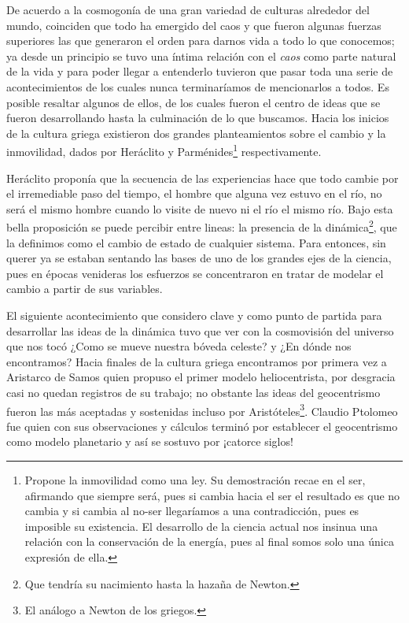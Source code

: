 \documentclass[11pt,a4paper]{article}
\begin{document}
De acuerdo a la cosmogonía de una gran variedad de culturas alrededor del mundo, coinciden que todo ha emergido del caos y que fueron algunas fuerzas superiores las que generaron el orden para darnos vida a todo lo que conocemos; ya desde un principio se tuvo una íntima relación con el \emph{caos} como parte natural de la vida y para poder llegar a entenderlo tuvieron que pasar toda una serie de acontecimientos de los cuales nunca terminaríamos de mencionarlos a todos. Es posible resaltar algunos de ellos, de los cuales fueron el centro de ideas que se fueron desarrollando hasta la culminación de lo que buscamos. Hacia los inicios de la cultura griega existieron dos grandes planteamientos sobre el cambio y la inmovilidad, dados por Heráclito y Parménides\footnote{Propone la inmovilidad como una ley. Su demostración recae en el ser, afirmando que siempre será, pues si cambia hacia el ser el resultado es que no cambia y si cambia al no-ser llegaríamos a una contradicción, pues es imposible su existencia. El desarrollo de la ciencia actual nos insinua una relación con la conservación de la energía, pues al final somos solo una única expresión de ella.} respectivamente. 

Heráclito proponía que la secuencia de las experiencias hace que todo cambie por el irremediable paso del tiempo, el hombre que alguna vez estuvo en el río, no será el mismo hombre cuando lo visite de nuevo ni el río el mismo río. Bajo esta bella proposición se puede percibir entre lineas: la presencia de la dinámica\footnote{Que tendría su nacimiento hasta la hazaña de Newton.}, que  la definimos como el cambio de estado de cualquier sistema. Para entonces, sin querer ya se estaban sentando las bases de uno de los grandes ejes de la ciencia, pues en épocas venideras los esfuerzos se concentraron en tratar de modelar el cambio a partir de sus variables.

El siguiente acontecimiento que considero clave y como punto de partida para desarrollar las ideas de la dinámica tuvo que ver con la cosmovisión del universo que nos tocó ¿Como se mueve nuestra bóveda celeste? y ¿En dónde nos encontramos? Hacia finales de la cultura griega encontramos por primera vez a Aristarco de Samos quien propuso el primer modelo heliocentrista, por desgracia casi no quedan registros de su trabajo; no obstante las ideas del geocentrismo fueron las más aceptadas y sostenidas incluso por Aristóteles\footnote{El análogo a Newton de los griegos.}. Claudio Ptolomeo fue quien con sus observaciones y cálculos terminó por establecer el geocentrismo como modelo planetario y así se sostuvo por ¡catorce siglos!
\end{document}
